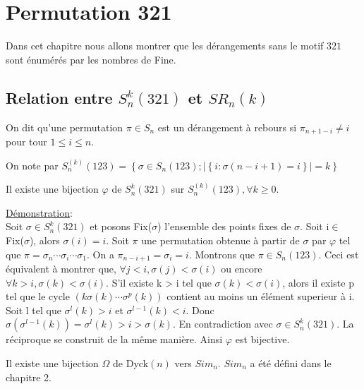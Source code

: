 \chapter{Permutation 321 }
Dans cet chapitre nous allons montrer que les dérangements sans le motif $321$ sont énumérés par les nombres de Fine. 
	\section{Relation entre $S_{n}^{k}(321)$ et $SR_{n}(k)$}
		\begin{definition}
			\begin{rm}
				On dit qu'une permutation $\pi \in S_{n}$ est un dérangement à rebours si $\pi_{n+1-i} \neq i$
				pour tour $1\leq i\leq n$.
			\end{rm}
		\end{definition}
		On note par $S_{n}^{(k)}(123)=\left\{ \sigma\in S_{n}(123) ;|\left\{ i:\sigma(n-i+1)=i \right\}| = k \right\}$
		\begin{proposition}
			Il existe une bijection $\varphi$ de $S_{n}^k(321)$ sur $S_{n}^{(k)}(123),\forall k\geq0$.
		\end{proposition}

		\underline{Démonstration}:\\
		Soit $\sigma\in S_{n}^k(321)$ et posons Fix($\sigma$) l'ensemble des points fixes de $\sigma$. Soit i$\in$ Fix($\sigma$), alors $\sigma(i)=i$. Soit $\pi$ une permutation obtenue à partir de $\sigma$ par $\varphi$ tel que $\pi=\sigma_{n}\cdots \sigma_{i}\cdots\sigma_{1}$. On a $\pi_{n-i+1}=\sigma_{i}=i$. Montrons que $\pi \in S_{n}(123)$. Ceci est équivalent à montrer que, $\forall j<i, \sigma(j) < \sigma(i) $ ou encore $\forall k > i,\sigma(k) < \sigma(i) $. S'il existe k > i tel que $\sigma(k) < \sigma(i) $, alors il existe p tel que le cycle $(k\sigma(k) \cdots \sigma^{p}(k) )$ contient au moins un élément superieur à i. Soit l tel que $\sigma^{l}(k)>i$ et $\sigma^{l-1}(k)<i$. Donc $ \sigma(\sigma^{l-1}(k)) = \sigma^{l}(k)>i> \sigma(k) $. En contradiction avec  $\sigma\in S_{n}^{k}(321)$.  La réciproque se construit de la même manière. Ainsi $\varphi$ est bijective.
		\begin{proposition}
			Il existe une bijection $\Omega$ de Dyck$(n)$ vers $Sim_{n}$. $Sim_{n}$ a été défini dans le chapitre 2.
		\end{proposition}

